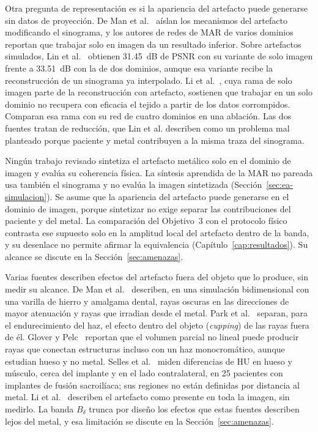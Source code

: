 Otra pregunta de representación es si la apariencia del artefacto puede generarse sin datos de proyección. De Man et al.~\cite{deman1999} aíslan los mecanismos del artefacto modificando el sinograma, y los autores de redes de MAR de varios dominios reportan que trabajar solo en imagen da un resultado inferior. Sobre artefactos simulados, Lin et al.~\cite{lin2019} obtienen 31.45~dB de PSNR con su variante de solo imagen frente a 33.51~dB con la de dos dominios, aunque esa variante recibe la reconstrucción de un sinograma ya interpolado. Li et al.~\cite{li2024}, cuya rama de solo imagen parte de la reconstrucción con artefacto, sostienen que trabajar en un solo dominio no recupera con eficacia el tejido a partir de los datos corrompidos. Comparan esa rama con su red de cuatro dominios en una ablación. Las dos fuentes tratan de reducción, que Lin et al. describen como un problema mal planteado porque paciente y metal contribuyen a la misma traza del sinograma.

Ningún trabajo revisado sintetiza el artefacto metálico solo en el dominio de imagen y evalúa su coherencia física. La síntesis aprendida de la MAR no pareada usa también el sinograma y no evalúa la imagen sintetizada (Sección~\ref{sec:ea-simulacion}). Se asume que la apariencia del artefacto puede generarse en el dominio de imagen, porque sintetizar no exige separar las contribuciones del paciente y del metal. La comparación del Objetivo~3 con el protocolo físico contrasta ese supuesto solo en la amplitud local del artefacto dentro de la banda, y su desenlace no permite afirmar la equivalencia (Capítulo~\ref{cap:resultados}). Su alcance se discute en la Sección~\ref{sec:amenazas}.

Varias fuentes describen efectos del artefacto fuera del objeto que lo produce, sin medir su alcance. De Man et al.~\cite{deman1999} describen, en una simulación bidimensional con una varilla de hierro y amalgama dental, rayas oscuras en las direcciones de mayor atenuación y rayas que irradian desde el metal. Park et al.~\cite{park2015ct} separan, para el endurecimiento del haz, el efecto dentro del objeto (\emph{cupping}) de las rayas fuera de él. Glover y Pelc~\cite{glover1980nonlinear} reportan que el volumen parcial no lineal puede producir rayas que conectan estructuras incluso con un haz monocromático, aunque estudian hueso y no metal. Selles et al.~\cite{selles2023ai} miden diferencias de HU en hueso y músculo, cerca del implante y en el lado contralateral, en 25 pacientes con implantes de fusión sacroilíaca; sus regiones no están definidas por distancia al metal. Li et al.~\cite{li2024} describen el artefacto como presente en toda la imagen, sin medirlo. La banda $B_{\delta}$ trunca por diseño los efectos que estas fuentes describen lejos del metal, y esa limitación se discute en la Sección~\ref{sec:amenazas}.

